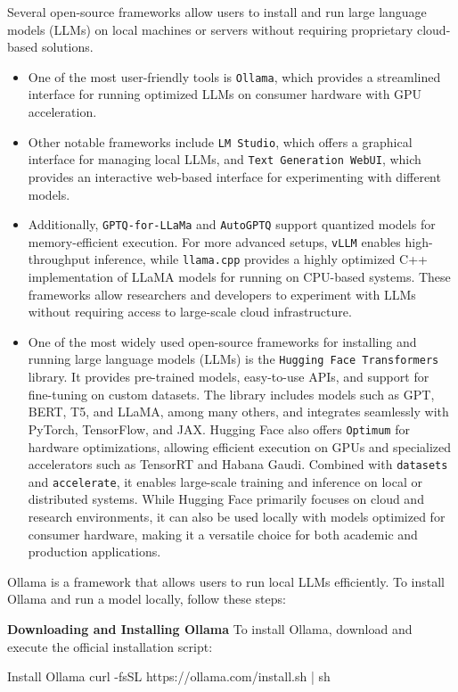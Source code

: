 Several open-source frameworks allow users to install and run large language models (LLMs) on local machines or servers without requiring proprietary cloud-based solutions. 
\begin{itemize}
\item
One of the most user-friendly tools is {\tt Ollama}, which provides a streamlined interface for running optimized LLMs on consumer hardware with GPU acceleration. 
\item
Other notable frameworks include {\tt LM Studio}, which offers a graphical interface for managing local LLMs, and {\tt Text Generation WebUI}, which provides an interactive web-based interface for experimenting with different models. 
\item
Additionally, {\tt GPTQ-for-LLaMa} and {\tt AutoGPTQ} support quantized models for memory-efficient execution. For more advanced setups, {\tt vLLM} enables high-throughput inference, while {\tt llama.cpp} provides a highly optimized C++ implementation of LLaMA models for running on CPU-based systems. These frameworks allow researchers and developers to experiment with LLMs without requiring access to large-scale cloud infrastructure.
\item
One of the most widely used open-source frameworks for installing and running large language models (LLMs) is the {\tt Hugging Face Transformers} library. It provides pre-trained models, easy-to-use APIs, and support for fine-tuning on custom datasets. The library includes models such as GPT, BERT, T5, and LLaMA, among many others, and integrates seamlessly with PyTorch, TensorFlow, and JAX. Hugging Face also offers {\tt Optimum} for hardware optimizations, allowing efficient execution on GPUs and specialized accelerators such as TensorRT and Habana Gaudi. Combined with {\tt datasets} and {\tt accelerate}, it enables large-scale training and inference on local or distributed systems. While Hugging Face primarily focuses on cloud and research environments, it can also be used locally with models optimized for consumer hardware, making it a versatile choice for both academic and production applications.
\end{itemize}

Ollama is a framework that allows users to run local LLMs efficiently. To install Ollama and run a model locally, follow these steps:

{\bf Downloading and Installing Ollama}  
To install Ollama, download and execute the official installation script:

\begin{codeonly}{Install Ollama}
curl -fsSL https://ollama.com/install.sh | sh
\end{codeonly}

